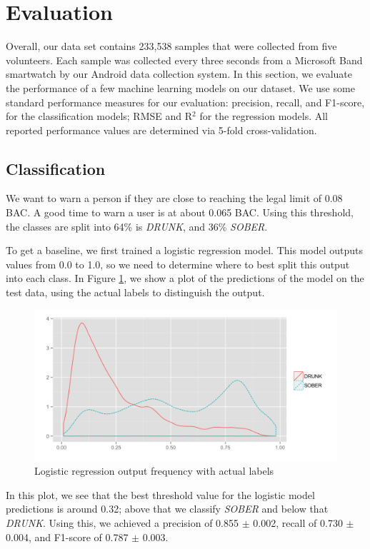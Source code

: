 \section{Evaluation}

Overall, our data set contains 233,538 samples that were collected from five volunteers. Each sample was collected every three seconds from a Microsoft Band smartwatch by our Android data collection system. In this section, we evaluate the performance of a few machine learning models on our dataset. We use some standard performance measures for our evaluation: precision, recall, and F1-score, for the classification models; RMSE and R$^2$ for the regression models. All reported performance values are determined via 5-fold cross-validation.

\subsection{Classification}

We want to warn a person if they are close to reaching the legal limit of 0.08 BAC. A good time to warn a user is at about 0.065 BAC. Using this threshold, the classes are split into 64\% is \textit{DRUNK}, and 36\% \textit{SOBER}.

To get a baseline, we first trained a logistic regression model. This model outputs values from 0.0 to 1.0, so we need to determine where to best split this output into each class. In Figure \ref{fig:log_pred_density}, we show a plot of the predictions of the model on the test data, using the actual labels to distinguish the output. \begin{figure}
	\includegraphics[width=1.0\textwidth]{figs/log_pred_density}
	\caption{Logistic regression output frequency with actual labels}
	\label{fig:log_pred_density}
\end{figure}In this plot, we see that the best threshold value for the logistic model predictions is around 0.32; above that we classify \textit{SOBER} and below that \textit{DRUNK}. Using this, we achieved a precision of 0.855 $\pm$ 0.002, recall of 0.730 $\pm$ 0.004, and F1-score of 0.787 $\pm$ 0.003.

